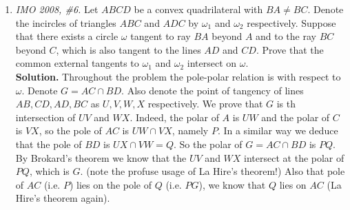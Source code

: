 \documentclass[11pt,a4paper]{article}
\begin{document}
\begin{enumerate}
\item \emph {IMO 2008, \#6.} Let $ABCD$ be a convex quadrilateral with $ BA\neq BC$. Denote the incircles of triangles $ ABC$ and $ ADC$ by $ \omega_{1}$ and $ \omega_{2}$ respectively. Suppose that there exists a circle $ \omega$ tangent to ray $ BA$ beyond $ A$ and to the ray $ BC$ beyond $ C$, which is also tangent to the lines $ AD$ and $ CD$. Prove that the common external tangents to $ \omega_{1}$ and $\omega_{2}$ intersect on $\omega$.\\
\textbf {Solution.} Throughout the problem the pole-polar relation is with respect to $\omega$. Denote $G=AC\cap BD$. Also denote the point of tangency of lines $AB, CD, AD, BC$ as $U,V,W,X$ respectively. We prove that $G$ is th intersection of $UV$ and $WX$. Indeed, the polar of $A$ is $UW$ and the polar of $C$ is $VX$, so the pole of $AC$ is $UW\cap VX$, namely $P$. In a similar way we deduce that the pole of $BD$ is $UX\cap VW=Q$. So the polar of $G=AC\cap BD$ is $PQ$. By Brokard's theorem we know that the $UV$ and $WX$ intersect at the polar of $PQ$, which is $G$. (note the profuse usage of La Hire's theorem!) Also that pole of $AC$ (i.e. $P$) lies on the pole of $Q$ (i.e. $PG$), we know that $Q$ lies on $AC$ (La Hire's theorem again).


\end{enumerate}
\end{document}
